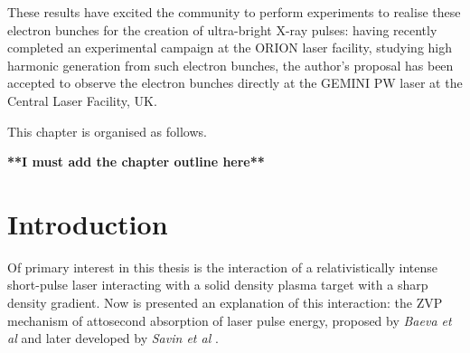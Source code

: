 These results have excited the community to perform experiments to realise these electron bunches for the creation of ultra-bright X-ray pulses: having recently completed an experimental campaign at the ORION laser facility, studying high harmonic generation from such electron bunches, the author's proposal has been accepted to observe the electron bunches directly at the GEMINI PW laser at the Central Laser Facility, UK.

This chapter is organised as follows. 

\textbf{**I must add the chapter outline here**}



\section{Introduction}
Of primary interest in this thesis is the interaction of a relativistically intense short-pulse laser interacting with a solid density plasma target with a sharp density gradient. Now is presented an explanation of this interaction: the \ac{ZVP} mechanism of attosecond absorption of laser pulse energy, proposed by \textit{Baeva et al} \cite{baevaZeroVectorPotential2011} and later developed by \textit{Savin et al} \cite{savinAttosecondscaleAbsorptionExtreme2017,savinModellingLaserPlasmaInteractions2019}. 


